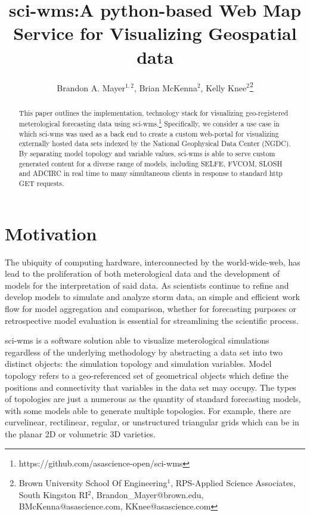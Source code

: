 \documentclass[11pt,twocolumn,twoside]{IEEEtran}
\begin{document}
\title{\vspace{0.2in}\sc sci-wms:A python-based Web Map Service for Visualizing Geospatial data}
\author{Brandon A. Mayer$^{1,2}$, Brian McKenna$^{2}$, Kelly Knee$^{2}$\thanks{Brown University School Of Engineering$^{1}$, RPS-Applied Science Associates, South Kingston RI$^{2}$, Brandon\_Mayer@brown.edu, BMcKenna@asascience.com, KKnee@asascience.com}}

\maketitle
\thispagestyle{fancy}

\begin{abstract}
This paper outlines the implementation, technology stack for
visualizing geo-registered meterological forecasting data using
sci-wms.\footnote{https://github.com/asascience-open/sci-wms}
Specifically, we consider a use case in which sci-wms was used as a
back end to create a custom web-portal for visualizing externally
hosted data sets indexed by the National Geophysical Data Center
(NGDC). By separating model topology and variable values, sci-wms is
able to serve custom generated content for a diverse range of models,
including SELFE, FVCOM, SLOSH and ADCIRC in real time to many
simultaneous clients in response to standard http GET requests.
\end{abstract}

\section{Motivation}
The ubiquity of computing hardware, interconnected by the
world-wide-web, has lead to the proliferation of both meterological
data and the development of models for the interpretation of said
data. As scientists continue to refine and develop models to simulate
and analyze storm data, an simple and efficient work flow for model
aggregation and comparison, whether for forecasting purposes or
retrospective model evaluation is essential for streamlining the
scientific process.

sci-wms is a software solution able to visualize meterological
simulations regardless of the underlying methodology by abstracting a
data set into two distinct objects: the simulation topology and
simulation variables. Model topology refers to a geo-referenced set of
geometrical objects which define the positions and connectivity that
variables in the data set may occupy. The types of topologies are just
a numerous as the quantity of standard forecasting models, with some
models able to generate multiple topologies. For example, there are
curvelinear, rectilinear, regular, or unstructured triangular grids
which can be in the planar 2D or volumetric 3D varieties.



\end{document}
